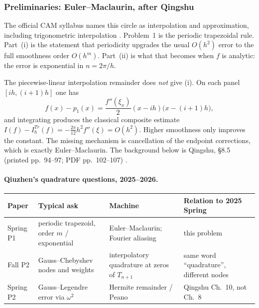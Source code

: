 \setcounter{section}{1}
\setcounter{theorem}{0}
\setcounter{definition}{0}
\setcounter{remark}{0}
\setcounter{note}{0}

\subsubsection{Preliminaries: Euler--Maclaurin, after Qingshu}

The official CAM syllabus names this circle as interpolation and approximation, including trigonometric interpolation \cite{conte00}. Problem~1 is the periodic trapezoidal rule. Part~(i) is the statement that periodicity upgrades the usual \(O(h^{2})\) error to the full smoothness order \(O(h^{m})\). Part~(ii) is what that becomes when \(f\) is analytic: the error is exponential in \(n=2\pi/h\).

The piecewise-linear interpolation remainder does \emph{not} give (i). On each panel \([ih,(i+1)h]\) one has
\[
f(x)-p_{1}(x)
=
\frac{f''(\xi_{x})}{2}(x-ih)\bigl(x-(i+1)h\bigr),
\]
and integrating produces the classical composite estimate \(I(f)-I_{h}^{Tr}(f)=-\frac{2\pi}{12}h^{2}f''(\xi)=O(h^{2})\). Higher smoothness only improves the constant. The missing mechanism is cancellation of the endpoint corrections, which is exactly Euler--Maclaurin. The background below is Qingshu, \S8.5 (printed pp.~94--97; PDF pp.~102--107) \cite{qingshu11}.

\paragraph{Qiuzhen's quadrature questions, 2025--2026.}

{\footnotesize
\begin{center}
\begin{tabular}{@{}>{\raggedright\arraybackslash}p{2.45cm}
                   >{\raggedright\arraybackslash}p{4.35cm}
                   >{\raggedright\arraybackslash}p{3.45cm}
                   >{\raggedright\arraybackslash}p{3.55cm}@{}}
\toprule
Paper & Typical ask & Machine & Relation to 2025 Spring \\
\midrule
2025 Spring P1 & periodic trapezoid, order \(m\) / exponential & Euler--Maclaurin; Fourier aliasing & this problem \\
2025 Fall P2 & Gauss--Chebyshev nodes and weights & interpolatory quadrature at zeros of \(T_{n+1}\) & same word ``quadrature'', different nodes \\
2026 Spring P2 & Gauss--Legendre error via \(\omega^{2}\) & Hermite remainder / Peano & Qingshu Ch.~10, not Ch.~8 \\
\bottomrule
\end{tabular}
\end{center}
}

